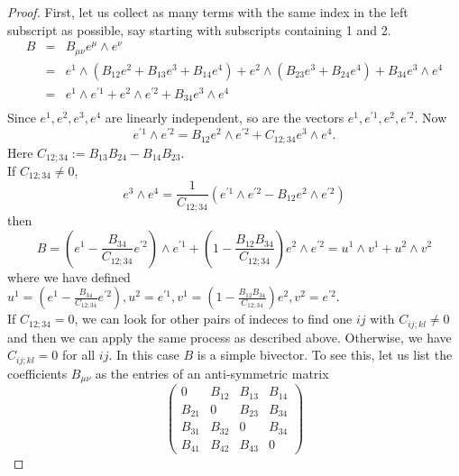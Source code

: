 \documentclass{article}
\begin{document}
\begin{proof}
First, let us collect as many terms with the same index in the left subscript as possible, say starting with subscripts containing 1 and 2.
\begin{eqnarray}
B & = & B_{\mu \nu} e^{\mu}\wedge e^{\nu} \nonumber\\
 & = & e^{1}\wedge (B_{12} e^{2}+B_{13} e^{3}+B_{14} e^{4}) +  e^{2}\wedge ( B_{23} e^{3}+B_{24} e^{4}) + B_{34}e^3 \wedge e^4 \nonumber\\
 & = & e^{1}\wedge e^{\prime 1} +  e^{2}\wedge e^{\prime 2} + B_{34} e^3 \wedge e^4 \nonumber\\
\end{eqnarray}
Since $e^1, e^2, e^3, e^4$ are linearly independent, so are the vectors $e^1, e^{\prime 1}, e^2, e^{\prime 2}$. Now
\begin{equation}
\label{}
e^{\prime 1}\wedge e^{\prime 2} = B_{12} e^2 \wedge e^{\prime 2} + C_{12;34} e^3 \wedge e^4.
\end{equation}
Here $C_{12;34}:= B_{13}B_{24} - B_{14}B_{23}$.\\
If $C_{12;34}\ne 0 $,
\begin{equation}
\label{}
e^3 \wedge e^4 = \frac{1}{C_{12;34}}\left(e^{\prime 1}\wedge e^{\prime 2} - B_{12}e^{2}\wedge e^{\prime 2}\right)
\end{equation}
then
\begin{equation}
\label{}
B = \left( e^1 - \frac{B_{34}}{C_{12;34}}e^{\prime 2}\right) \wedge e^{\prime 1} + \left( 1 - \frac{B_{12}B_{34}}{C_{12;34}}\right)e^{ 2} \wedge e^{\prime 2} = u^1 \wedge v^1 + u^2 \wedge v^2
\end{equation}
where we have defined $u^1=\left( e^1 - \frac{B_{34}}{C_{12;34}}e^{\prime 2}\right),u^2=e^{\prime 1},v^1=\left( 1 - \frac{B_{12}B_{34}}{C_{12;34}}\right)e^{ 2},v^2=e^{\prime 2}$.\\
If $C_{12;34} = 0$, we can look for other pairs of indeces to find one $ij$ with $C_{ij;kl}\ne 0$ and then we can apply the same process as described above. Otherwise, we have $C_{ij;kl} = 0$ for all $ij$. In this case $B$ is a simple bivector. To see this, let us list the coefficients $B_{\mu \nu}$ as the entries of an anti-symmetric matrix
\begin{equation}
\label{}
\left(\begin{array}{cccc}0 & B_{12} & B_{13} & B_{14} \\B_{21} & 0 & B_{23} & B_{34} \\B_{31} & B_{32} & 0 & B_{34} \\B_{41} & B_{42} & B_{43} & 0\end{array}\right)

\end{equation}
\end{proof}
\end{document}
